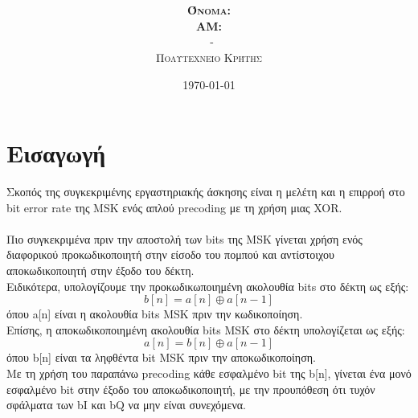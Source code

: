 \documentclass{article}
\title{\underline{\textbf{\assignmentNumber}}}
\author{\textsc{\textbf{Όνομα:}}  \studentName\\
		\textsc{\textbf{ΑΜ:}}  \studentNumber\\
		\course \ - \courseName\\ 
		\textsc{Πολυτεχνείο Κρήτης}
}
\date{\today}
\begin{document}
	\maketitle
\section{Εισαγωγή}
Σκοπός της συγκεκριμένης εργαστηριακής άσκησης είναι η μελέτη και η επιρροή στο bit error rate της MSK ενός απλού precoding με τη χρήση μιας XOR.
\\
\\
Πιο συγκεκριμένα πριν την αποστολή των bits της MSK γίνεται χρήση ενός διαφορικού προκωδικοποιητή  στην είσοδο του πομπού και αντίστοιχου αποκωδικοποιητή στην έξοδο του δέκτη.\\ Ειδικότερα, υπολογίζουμε την προκωδικωποιημένη ακολουθία bits στο δέκτη ως εξής:
$$b[n] = a[n] \oplus a[n-1]$$
όπου a[n] είναι η ακολουθία bits MSK πριν την κωδικοποίηση.\\
Επίσης, η αποκωδικοποιημένη ακολουθία bits MSK στο δέκτη υπολογίζεται ως εξής:
$$a[n] = b[n] \oplus a[n-1]$$
όπου b[n] είναι τα ληφθέντα bit MSK πριν την αποκωδικοποίηση.\\
Με τη χρήση του παραπάνω precoding  κάθε εσφαλμένο bit της b[n], γίνεται ένα μονό εσφαλμένο bit στην έξοδο του αποκωδικοποιητή, με την προυπόθεση ότι τυχόν σφάλματα των bI και bQ να μην είναι συνεχόμενα. \\
\end{document}
